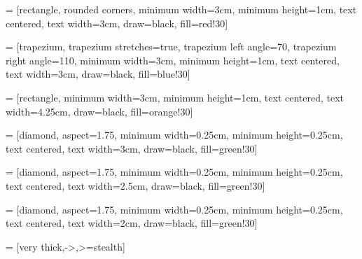 
 = [rectangle, rounded corners,
minimum width=3cm,
minimum height=1cm,
text centered,
text width=3cm,
draw=black,
fill=red!30]

 = [trapezium,
trapezium stretches=true, %
trapezium left angle=70,
trapezium right angle=110,
minimum width=3cm,
minimum height=1cm,
text centered,
text width=3cm,
draw=black, fill=blue!30]

 = [rectangle,
minimum width=3cm,
minimum height=1cm,
text centered,
text width=4.25cm,
draw=black,
fill=orange!30]

 = [diamond,
aspect=1.75,
minimum width=0.25cm,
minimum height=0.25cm,
text centered,
text width=3cm,
draw=black,
fill=green!30]

 = [diamond,
aspect=1.75,
minimum width=0.25cm,
minimum height=0.25cm,
text centered,
text width=2.5cm,
draw=black,
fill=green!30]

 = [diamond,
aspect=1.75,
minimum width=0.25cm,
minimum height=0.25cm,
text centered,
text width=2cm,
draw=black,
fill=green!30]

 = [very thick,->,>=stealth]

